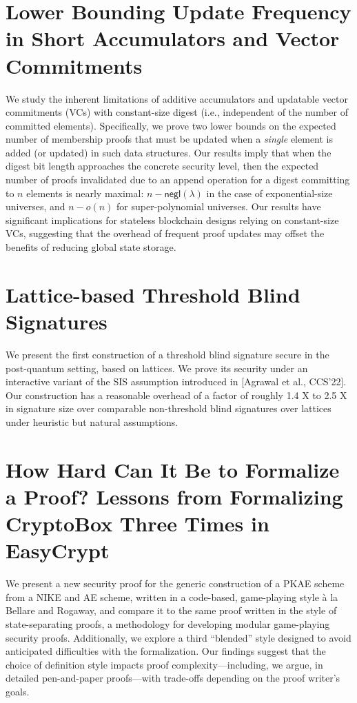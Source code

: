 \documentclass[11pt]{article}
\theoremstyle{definition}
\theoremstyle{remark}
\theoremstyle{plain}
\begin{document}
\section{\cite{cryptoeprint:2025/1558} Lower Bounding Update Frequency in Short Accumulators and Vector Commitments}
We study the inherent limitations of additive accumulators and updatable vector commitments (VCs) with constant-size digest (i.e., independent of the number of committed elements). Specifically, we prove two lower bounds on the expected number of membership proofs that must be updated when a \emph{single} element is added (or updated) in such data structures. Our results imply that when the digest bit length approaches the concrete security level, then the expected number of proofs invalidated due to an append operation for a digest committing to $n$ elements is nearly maximal: $n-\mathsf{negl}(\lambda)$ in the case of exponential-size universes, and $n-o(n)$ for super-polynomial universes. Our results have significant implications for stateless blockchain designs relying on constant-size VCs, suggesting that the overhead of frequent proof updates may offset the benefits of reducing global state storage.
\section{\cite{cryptoeprint:2025/1566} Lattice-based Threshold Blind Signatures}
We present the first construction of a threshold blind signature secure in the post-quantum setting, based on lattices. We prove its security under an interactive variant of the SIS assumption introduced in [Agrawal et al., CCS’22]. Our construction has a reasonable overhead of a factor of roughly 1.4 X to 2.5 X in signature size over comparable non-threshold blind signatures over lattices under heuristic but natural assumptions.
\section{\cite{cryptoeprint:2025/1569} How Hard Can It Be to Formalize a Proof? Lessons from Formalizing CryptoBox Three Times in EasyCrypt}
We present a new security proof for the generic construction of a PKAE scheme from a NIKE and AE scheme, written in a code-based, game-playing style à la Bellare and Rogaway, and compare it to the same proof written in the style of state-separating proofs, a methodology for developing modular game-playing security proofs. Additionally, we explore a third “blended” style designed to avoid anticipated difficulties with the formalization. Our findings suggest that the choice of definition style impacts proof complexity—including, we argue, in detailed pen-and-paper proofs—with trade-offs depending on the proof writer’s goals.


\end{document}
